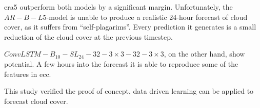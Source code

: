 \acrshort{era5} outperform both models by a significant margin.
Unfortunately, the $AR-B-L5$-model is unable to produce a realistic 24-hour forecast of cloud cover, as it suffers from ``self-plagarims''. Every prediction it generates is a small reduction of the cloud cover at the previous timestep.

$ConvLSTM-B_{10}-SL_{24}-32-3\times3-32-3 \times3$, on the other hand, show potential. A few hours into the forecast it is able to reproduce some of the features in \acrshort{ecc}. 

This study verified the proof of concept, data driven learning can be applied to forecast cloud cover.





\cleardoublepage